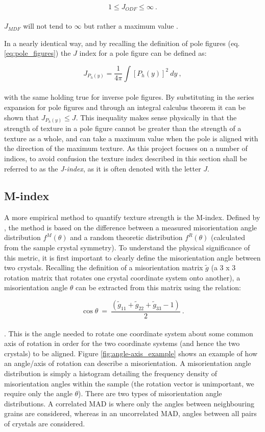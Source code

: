 \documentclass[a4paper,12pt]{report}
\numberwithin{equation}{chapter}
\begin{document}
\begin{equation}
1 \leq J_{ODF} \leq \infty\ .
\end{equation}
\\
$J_{MDF}$ will not tend to $\infty$ but rather a maximum value \citep{Mainprice}.

In a nearly identical way, and by recalling the definition of pole figures (eq. \ref{eq:pole_figures}) the $J$ index for a pole figure can be defined as:
 
\begin{equation}
J_{P_h(y)} = \frac{1}{4\pi} \int [ P_{h}(y) ]^2\ dy\ ,
\end{equation}
\\
with the same holding true for inverse pole figures. By substituting in the series expansion for pole figures and through an integral calculus theorem \citep[p.90]{bunge1982texture} it can be shown that $J_{P_h(y)} \leq J$. This inequality makes sense physically in that the strength of texture in a pole figure cannot be greater than the strength of a texture as a whole, and can take a maximum value when the pole is aligned with the direction of the maximum texture. As this project focuses on a number of indices, to avoid confusion the texture index described in this section shall be referred to as the \emph{J-index}, as it is often denoted with the letter $J$.


\subsection{M-index} \label{subsec:Mindex}
A more empirical method to quantify texture strength is the M-index. Defined by \cite{Skemer}, the method is based on the difference between a measured misorientation angle distribution $f^M(\theta)$ and a random theoretic distribution $f^R(\theta)$ (calculated from the sample crystal symmetry). To understand the physical significance of this metric, it is first important to clearly define the misorientation angle between two crystals. Recalling the definition of a misorientation matrix $\tilde{g}$ (a 3 x 3 rotation matrix that rotates one crystal coordinate system onto another), a misorientation angle $\theta$ can be extracted from this matrix using the relation:

\begin{equation}
\cos{\theta}\ =\ \frac{(\tilde{g}_{11} + \tilde{g}_{22} + \tilde{g}_{33} - 1)}{2}\ .
\end{equation} 
\\
\citep{Randle2000}. This is the angle needed to rotate one coordinate system about some common axis of rotation in order for the two coordinate systems (and hence the two crystals) to be aligned. Figure \ref{fig:angle-axis_example} shows an example of how an angle/axis of rotation can describe a misorientation. A misorientation angle distribution is simply a histogram detailing the frequency density of misorientation angles within the sample (the rotation vector is unimportant, we require only the angle $\theta$). There are two types of misorientation angle distributions. A correlated MAD is where only the angles between neighbouring grains are considered, whereas in an uncorrelated MAD, angles between all pairs of crystals are considered.
\end{document}
